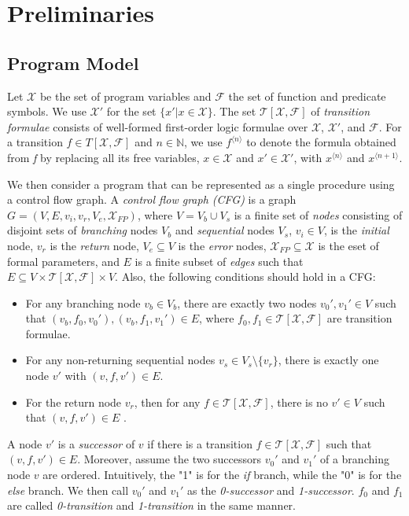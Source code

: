 
\chapter{Preliminaries}\label{ch:preliminaries}

\section{Program Model}\label{sec:model}

Let $\mathcal{X}$ be the set of program variables and $\mathcal{F}$ the set of function and predicate symbols. We use $\mathcal{X'}$ for the set $\{x'| x \in \mathcal{X}\}$. The set $\mathcal{T}[\mathcal{X}, \mathcal{F}]$ of \textit{transition formulae} consists of well-formed first-order logic formulae over $\mathcal{X}$, $\mathcal{X'}$, and $\mathcal{F}$. For a transition $f \in {T}[\mathcal{X}, \mathcal{F}]$ and $\mathit{n} \in \mathbb{N}$, we use $f^{\langle n \rangle}$ to denote the formula obtained from \textit{f} by replacing all its free variables, $x \in \mathcal{X}$ and $x' \in \mathcal{X'}$, with $x^{ \langle n \rangle }$ and $x^{\langle n+1 \rangle }$. 

We then consider a program that can be represented as a single procedure using a control flow graph. A \emph{control flow graph (CFG)} is a graph $G = (V, E, v_i, v_r, V_e, \mathcal{X}_{FP})$, where $V = V_b \cup V_s$ is a finite set of \emph{nodes} consisting of disjoint sets of \emph{branching} nodes $V_b$ and \emph{sequential} nodes $V_s$, $v_i \in V$, is the \emph{initial} node, $v_r$ is the \emph{return} node, $V_e \subseteq V$ is the \emph{error} nodes, $\mathcal{X}_{FP} \subseteq \mathcal{X}$ is the eset of formal parameters, and $E$ is a finite subset of \emph{edges} such that $E \subseteq V \times \mathcal{T[X,F]} \times V$. Also, the following conditions should hold in a CFG:
\begin{itemize}
	\item For any branching node $v_b \in V_b$, there are exactly two nodes $v_0' , v_1' \in V$ such that $(v_b, f_0, v_0'), (v_b, f_1, v_1') \in E$, where $f_0, f_1 \in \mathcal{T[X,F]}$ are transition formulae.
	
	\item For any non-returning sequential nodes $v_s \in V_s \setminus \{v_r\}$, there is exactly one node $v'$ with $(v, f, v') \in E$.
	
	\item For the return node $v_r$, then for any $f \in \mathcal{T[X,F]}$, there is no $v' \in V$ such that $(v, f, v') \in E$ .
\end{itemize}
A node $v'$ is a \emph{successor} of $v$ if there is a transition $f \in \mathcal{T[X,F]}$ such that $(v, f, v') \in E$. Moreover, assume the two successors $v_0'$ and $v_1'$ of a branching node $v$ are ordered. Intuitively, the "1" is for the \emph{if} branch, while the "0" is for the \emph{else} branch. We then call $v_0'$ and $v_1'$ as the \emph{0-successor} and \emph{1-successor}. $f_0$ and $f_1$ are called \emph{0-transition} and \emph{1-transition} in the same manner. 

